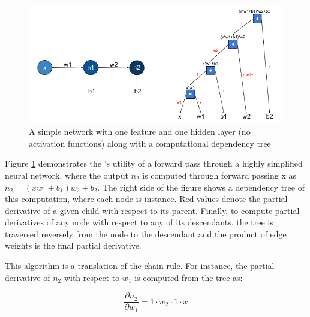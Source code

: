 \begin{figure}[ht]
\centering
\includegraphics[scale=0.6]{figures/backprop.png}
\captionsetup{justification=centering,margin=2cm}
\caption{A simple network with one feature and one hidden layer (no activation functions) along with a computational dependency tree}
\label{backprop}
\end{figure}

Figure \ref{backprop} demonstrates the 's utility of a forward pass through a highly simplified neural network, where the output $n_2$ is computed through forward passing x as $n_2 = (xw_1+b_1)w_2+b_2$. The right side of the figure shows a dependency tree of this computation, where each node is  instance. Red values denote the partial derivative of a given child with respect to its parent. Finally, to compute partial derivatives of any node with respect to any of its descendants, the tree is traversed reversely from the node to the descendant and the product of edge weights is the final partial derivative.

This algorithm is a translation of the chain rule. For instance, the partial derivative of $n_2$ with respect to $w_1$ is computed from the  tree as:

$$\frac{\partial n_2}{\partial w_1} = 1\cdot w_2 \cdot 1 \cdot x$$


